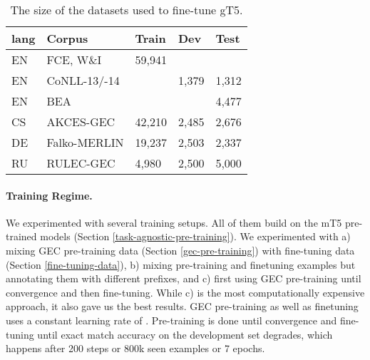 \documentclass[11pt,a4paper]{article}
\newcommand{\GT}[0]{{gT5}\xspace}
\begin{document}
\begin{table}[h]
\footnotesize
\begin{tabularx}{\columnwidth}{lXlll}
\toprule 
lang & Corpus & Train & Dev & Test \\ \midrule 
EN   & FCE, W\&I    & 59,941 &  &  \\
EN   & CoNLL-13/-14 &        & 1,379 & 1,312 \\
EN   & BEA          &        &       & 4,477 \\
CS   & AKCES-GEC    & 42,210 & 2,485 & 2,676       \\
DE   & Falko-MERLIN & 19,237 & 2,503 & 2,337       \\
RU   & RULEC-GEC    &  4,980 & 2,500 & 5,000       \\
\bottomrule 
\end{tabularx}
\caption{The size of the datasets used to fine-tune \GT.}
\label{tbl:dataset}
\end{table}

\paragraph*{Training Regime.}
We experimented with several training setups. All of them build on the mT5 pre-trained models (Section \ref{task-agnostic-pre-training}). We experimented with
a) mixing GEC pre-training data (Section \ref{gec-pre-training}) with fine-tuning data (Section \ref{fine-tuning-data}),
b) mixing pre-training and finetuning examples but annotating them with different prefixes, and
c) first using GEC pre-training until convergence and then fine-tuning.
While c) is the most computationally expensive approach, it also gave us the best results.
GEC pre-training as well as finetuning uses a constant learning rate of .
Pre-training is done until convergence and fine-tuning until exact match accuracy on the development set degrades, which happens after 200 steps or 800k seen examples or 7 epochs.
\end{document}
